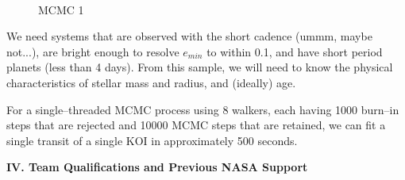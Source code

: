 \begin{figure}[t] 
\begin{center} 
\mbox{
\quad
{}
}
\caption{MCMC 1}
\label{fig-mcmc1} 
\end{center} 
\end{figure}

\medskip
{\centerline{}}
\smallskip

We need systems that are observed with the short cadence (ummm, maybe
not...), are bright enough to resolve $e_{min}$ to within 0.1, and
have short period planets (less than 4 days).  From this sample, we
will need to know the physical characteristics of stellar mass and
radius, and (ideally) age.

\medskip
{\centerline{}}
\smallskip

For a single--threaded MCMC process using 8 walkers, each having 1000
burn--in steps that are rejected and 10000 MCMC steps that are
retained, we can fit a single transit of a single KOI in approximately
500 seconds.


\bigskip
\centerline{\bf IV. Team Qualifications and Previous NASA Support}
\smallskip


